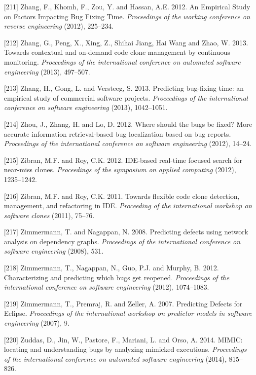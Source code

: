 \documentclass[12pt]{report}
\begin{document}
\hypertarget{ref-Zhang2012}{}
{[}211{]} Zhang, F., Khomh, F., Zou, Y. and Hassan, A.E. 2012. An
Empirical Study on Factors Impacting Bug Fixing Time. \emph{Proceedings
of the working conference on reverse engineering} (2012), 225--234.

\hypertarget{ref-Zhang2013a}{}
{[}212{]} Zhang, G., Peng, X., Xing, Z., Shihai Jiang, Hai Wang and
Zhao, W. 2013. Towards contextual and on-demand code clone management by
continuous monitoring. \emph{Proceedings of the international conference
on automated software engineering} (2013), 497--507.

\hypertarget{ref-Zhang2013}{}
{[}213{]} Zhang, H., Gong, L. and Versteeg, S. 2013. Predicting
bug-fixing time: an empirical study of commercial software projects.
\emph{Proceedings of the international conference on software
engineering} (2013), 1042--1051.

\hypertarget{ref-Zhou2012}{}
{[}214{]} Zhou, J., Zhang, H. and Lo, D. 2012. Where should the bugs be
fixed? More accurate information retrieval-based bug localization based
on bug reports. \emph{Proceedings of the international conference on
software engineering} (2012), 14--24.

\hypertarget{ref-Zibran2012}{}
{[}215{]} Zibran, M.F. and Roy, C.K. 2012. IDE-based real-time focused
search for near-miss clones. \emph{Proceedings of the symposium on
applied computing} (2012), 1235--1242.

\hypertarget{ref-Zibran2011}{}
{[}216{]} Zibran, M.F. and Roy, C.K. 2011. Towards flexible code clone
detection, management, and refactoring in IDE. \emph{Proceeding of the
international workshop on software clones} (2011), 75--76.

\hypertarget{ref-Zimmermann2008}{}
{[}217{]} Zimmermann, T. and Nagappan, N. 2008. Predicting defects using
network analysis on dependency graphs. \emph{Proceedings of the
international conference on software engineering} (2008), 531.

\hypertarget{ref-Zimmermann2012}{}
{[}218{]} Zimmermann, T., Nagappan, N., Guo, P.J. and Murphy, B. 2012.
Characterizing and predicting which bugs get reopened. \emph{Proceedings
of the international conference on software engineering} (2012),
1074--1083.

\hypertarget{ref-Zimmermann2007}{}
{[}219{]} Zimmermann, T., Premraj, R. and Zeller, A. 2007. Predicting
Defects for Eclipse. \emph{Proceedings of the international workshop on
predictor models in software engineering} (2007), 9.

\hypertarget{ref-Zuddas2014}{}
{[}220{]} Zuddas, D., Jin, W., Pastore, F., Mariani, L. and Orso, A.
2014. MIMIC: locating and understanding bugs by analyzing mimicked
executions. \emph{Proceedings of the international conference on
automated software engineering} (2014), 815--826.

\end{document}
